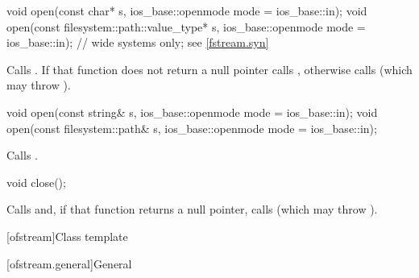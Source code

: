%
\begin{itemdecl}
void open(const char* s, ios_base::openmode mode = ios_base::in);
void open(const filesystem::path::value_type* s,
          ios_base::openmode mode = ios_base::in);  // wide systems only; see \ref{fstream.syn}
\end{itemdecl}

\begin{itemdescr}
\pnum
\effects
Calls
.
If that function does not return a null pointer
calls ,
otherwise calls
(which may throw
).
\end{itemdescr}

%
\begin{itemdecl}
void open(const string& s, ios_base::openmode mode = ios_base::in);
void open(const filesystem::path& s, ios_base::openmode mode = ios_base::in);
\end{itemdecl}

\begin{itemdescr}
\pnum
\effects
Calls .
\end{itemdescr}

%
\begin{itemdecl}
void close();
\end{itemdecl}

\begin{itemdescr}
\pnum
\effects
Calls
and, if that function returns
a null pointer,
calls
(which may throw
).
\end{itemdescr}

[ofstream]{Class template }

[ofstream.general]{General}

